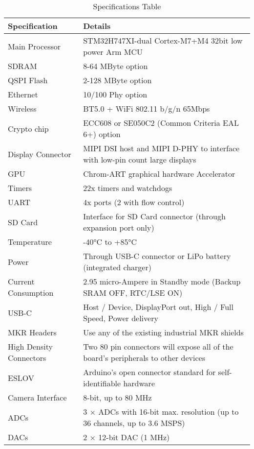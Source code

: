\begin{table}[h]
	\centering
	\small
	\caption{Specifications Table}
	\label{tab:specs}
	\begin{tabular}{|p{3cm}|p{11cm}|}
		\hline
		\textbf{Specification} & \textbf{Details} \\
		\hline
		Main Processor & STM32H747XI-dual Cortex-M7+M4 32bit low power Arm MCU \\ \hline
		SDRAM & 8-64 MByte option\\ \hline
		QSPI Flash & 2-128 MByte option\\ \hline
		Ethernet & 10/100 Phy option\\ \hline
		Wireless & BT5.0 + WiFi 802.11 b/g/n 65Mbps\\ \hline
		Crypto chip & ECC608 or SE050C2 (Common Criteria EAL 6+) option\\ \hline
		Display Connector & MIPI DSI host and MIPI D-PHY  to interface with low-pin count large displays \\ \hline
		GPU & Chrom-ART graphical hardware Accelerator \\ \hline
		Timers & 22x timers and watchdogs \\ \hline
		UART & 4x ports (2 with flow control) \\ \hline
		SD Card & Interface for SD Card connector (through expansion port only) \\ \hline
		Temperature & -40°C to +85°C \\ \hline
		Power & Through USB-C connector or LiPo battery (integrated charger) \\ \hline
		Current Consumption & 2.95 micro-Ampere in Standby mode (Backup SRAM OFF, RTC/LSE ON)\\ \hline
		USB-C & Host / Device, DisplayPort out, High / Full Speed, Power delivery \\ \hline
		MKR Headers & Use any of the existing industrial MKR shields \\ \hline
		High Density Connectors & Two 80 pin connectors will expose all of the board’s peripherals to other devices\\ \hline
		ESLOV & Arduino's open connector standard for self-identifiable hardware \\ \hline
		Camera Interface & 8-bit, up to 80 MHz \\ \hline
		ADCs & 3 × ADCs with 16-bit max. resolution (up to 36 channels, up to 3.6 MSPS) \\ \hline
		DACs & 2 × 12-bit DAC (1 MHz) \\
		\hline
	\end{tabular}
\end{table}



		
		


	
